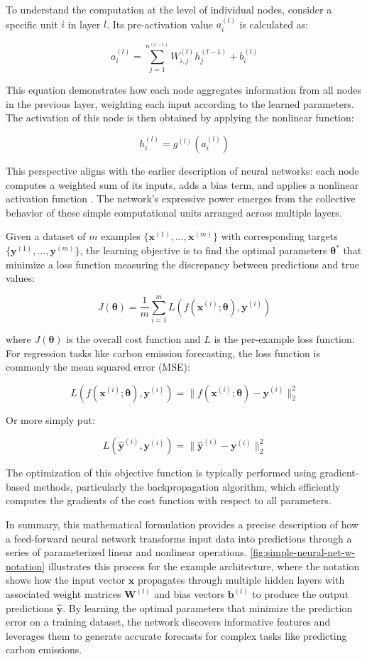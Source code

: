 To understand the computation at the level of individual nodes, consider a specific unit \(i\) in layer \(l\). Its pre-activation value \(a_i^{(l)}\) is calculated as:

\[
  a_i^{(l)} = \sum_{j=1}^{n^{(l-1)}} W_{i,j}^{(l)} h_j^{(l-1)} + b_i^{(l)}
\]

This equation demonstrates how each node aggregates information from all nodes in the previous layer, weighting each input according to the learned parameters. The activation of this node is then obtained by applying the nonlinear function:

\[
  h_i^{(l)} = g^{(l)}(a_i^{(l)})
\]

This perspective aligns with the earlier description of neural networks: each node computes a weighted sum of its inputs, adds a bias term, and applies a nonlinear activation function \parencite{goodfellow2016}. The network's expressive power emerges from the collective behavior of these simple computational units arranged across multiple layers.

Given a dataset of \(m\) examples \(\{\mathbf{x}^{(1)}, \ldots, \mathbf{x}^{(m)}\}\) with corresponding targets \(\{\mathbf{y}^{(1)}, \ldots, \mathbf{y}^{(m)}\}\), the learning objective is to find the optimal parameters \(\mathbf{\theta}^*\) that minimize a loss function measuring the discrepancy between predictions and true values:

\[
  J(\mathbf{\theta}) = \frac{1}{m}\sum_{i=1}^{m}L(f(\mathbf{x}^{(i)}; \mathbf{\theta}), \mathbf{y}^{(i)})
\]

where \(J(\mathbf{\theta})\) is the overall cost function and \(L\) is the per-example loss function. For regression tasks like carbon emission forecasting, the loss function is commonly the mean squared error (MSE):

\[
  L(f(\mathbf{x}^{(i)}; \mathbf{\theta}), \mathbf{y}^{(i)}) = \|f(\mathbf{x}^{(i)}; \mathbf{\theta}) - \mathbf{y}^{(i)}\|_2^2
\]

Or more simply put:

\[
  L(\mathbf{\hat{y}}^{(i)}, \mathbf{y}^{(i)}) = \|\mathbf{\hat{y}}^{(i)} - \mathbf{y}^{(i)}\|_2^2
\]

The optimization of this objective function is typically performed using gradient-based methods, particularly the backpropagation algorithm, which efficiently computes the gradients of the cost function with respect to all parameters.

In summary, this mathematical formulation provides a precise description of how a feed-forward neural network transforms input data into predictions through a series of parameterized linear and nonlinear operations. \autoref{fig:simple-neural-net-w-notation} illustrates this process for the example architecture, where the notation shows how the input vector \(\mathbf{x}\) propagates through multiple hidden layers with associated weight matrices \(\mathbf{W}^{(l)}\) and bias vectors \(\mathbf{b}^{(l)}\) to produce the output predictions \(\mathbf{\hat{y}}\). By learning the optimal parameters that minimize the prediction error on a training dataset, the network discovers informative features and leverages them to generate accurate forecasts for complex tasks like predicting carbon emissions.


